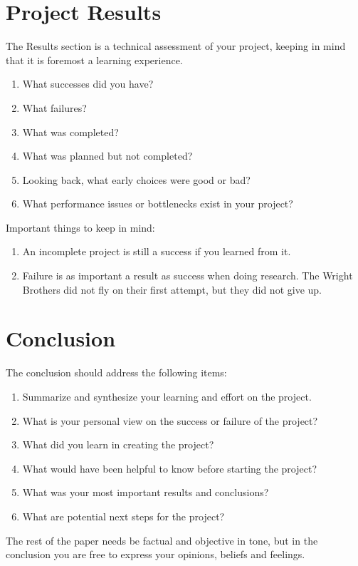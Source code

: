 \documentclass[acmlarge,screen]{acmart}
\begin{document}
\section{Project Results}
The Results section is a technical assessment of your project, keeping in mind that it is foremost a learning experience.
\begin{enumerate}
    \item What successes did you have?
    \item What failures?
    \item What was completed?
    \item What was planned but not completed?
    \item Looking back, what early choices were good or bad?
    \item What performance issues or bottlenecks exist in your project?
\end{enumerate}
Important things to keep in mind:
\begin{enumerate}
    \item An incomplete project is still a success if you learned from it.
    \item Failure is as important a result as success when doing research. The Wright Brothers did not fly 
    on their first attempt, but they did not give up.
\end{enumerate}

\section{Conclusion}
The conclusion should address the following items:
\begin{enumerate}
    \item Summarize and synthesize your learning and effort on the project.
    \item What is your personal view on the success or failure of the project?
    \item What did you learn in creating the project?
    \item What would have been helpful to know before starting the project?
    \item What was your most important results and conclusions?
    \item What are potential next steps for the project?
\end{enumerate}
The rest of the paper needs be factual and objective in tone, but in the conclusion you are free to express your
opinions, beliefs and feelings.
\end{document}
